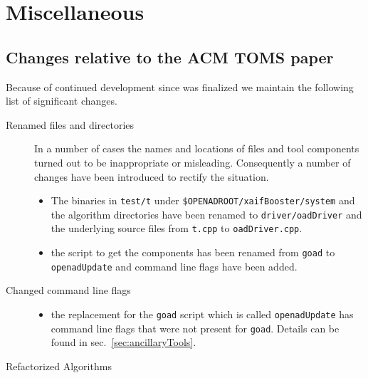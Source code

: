 \documentclass{book}
\newcommand{\refsec}[1]{{sec.~\ref{#1}}}
\begin{document}
\chapter{Miscellaneous}\label{sec:misc}
\section{Changes relative to the ACM TOMS paper}\label{sec:changesSinceTOMS}
Because of continued development since \cite{Utke2008OAM} was finalized 
we maintain the following list of significant changes.
\begin{description} 
\item[Renamed files and directories] In a number of cases the names and locations of files and 
tool components turned out to be inappropriate or misleading. Consequently a number of changes 
have been introduced to rectify the situation.  
{
\begin{itemize}
\item The binaries in \lstinline{test/t} under \lstinline{$OPENADROOT/xaifBooster/system} %
and the algorithm directories have been renamed to \lstinline{driver/oadDriver} and the 
underlying source files from \lstinline{t.cpp} to \lstinline{oadDriver.cpp}.
\item the script to get the components has been renamed from \lstinline{goad} to \lstinline{openadUpdate}
and command line flags have been added.
\end{itemize}
}
\item[Changed command line flags]
\begin{itemize}
\item the replacement for the \lstinline{goad} script which is called \lstinline{openadUpdate} has command 
line flags that were not present for \lstinline{goad}. Details can be found in \refsec{sec:ancillaryTools}.
\end{itemize}
\item[Refactorized Algorithms]
\end{description}
\end{document}
